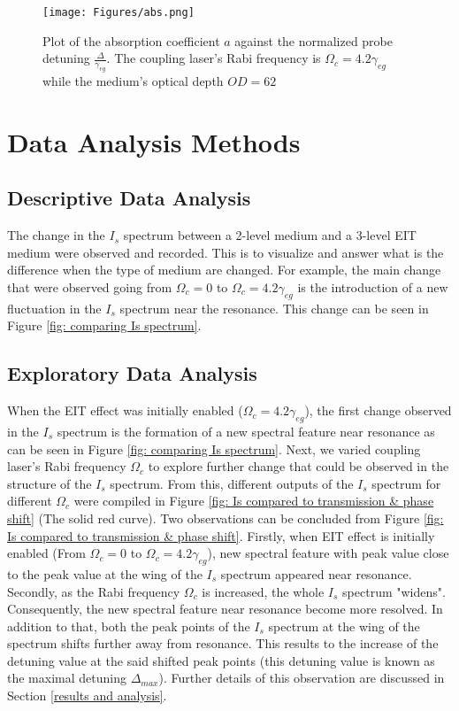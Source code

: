 \begin{figure}
    \centering
    \texttt{[image: Figures/abs.png]}
    \caption{Plot of the absorption coefficient $a$ against the normalized probe detuning $\frac{\Delta}{\gamma_{eg}}$. The coupling laser's Rabi frequency is $\Omega_{c} = 4.2\gamma_{eg}$ while the medium's optical depth $OD = 62$}
    \label{fig: abs}
\end{figure}


\section{Data Analysis Methods}
\subsection{Descriptive Data Analysis}
The change in the $I_{s}$ spectrum between a 2-level medium and a 3-level EIT medium were observed and recorded. This is to visualize and answer what is the difference when the type of medium are changed. For example, the main change that were observed going from $\Omega_{c} = 0$ to $\Omega_{c} = 4.2\gamma_{eg}$ is the introduction of a new fluctuation in the $I_{s}$ spectrum near the resonance. This change can be seen in Figure \ref{fig: comparing Is spectrum}. 

\subsection{Exploratory Data Analysis}
When the EIT effect was initially enabled ($\Omega_{c} = 4.2\gamma_{eg}$), the first change observed in the $I_{s}$ spectrum is the formation of a new spectral feature near resonance as can be seen in Figure \ref{fig: comparing Is spectrum}. Next, we varied coupling laser's Rabi frequency $\Omega_{c}$ to explore further change that could be observed in the structure of the $I_{s}$ spectrum. From this, different outputs of the $I_{s}$ spectrum for different $\Omega_{c}$ were compiled in Figure \ref{fig: Is compared to transmission & phase shift} (The solid red curve). Two observations can be concluded from Figure \ref{fig: Is compared to transmission & phase shift}. Firstly, when EIT effect is initially enabled (From $\Omega_{c} = 0$ to $\Omega_{c} = 4.2\gamma_{eg}$), new spectral feature with peak value close to the peak value at the wing of the $I_{s}$ spectrum appeared near resonance. Secondly, as the Rabi frequency $\Omega_{c}$ is increased, the whole $I_{s}$ spectrum "widens". Consequently, the new spectral feature near resonance become more resolved. In addition to that, both the peak points of the $I_{s}$ spectrum at the wing of the spectrum shifts further away from resonance. This results to the increase of the detuning value at the said shifted peak points (this detuning value is known as the maximal detuning $\Delta_{max}$). Further details of this observation are discussed in Section \ref{results and analysis}.


